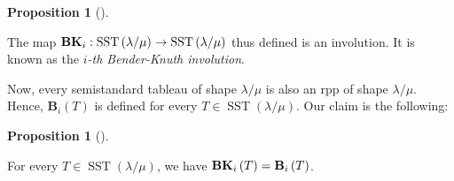 \documentclass[numbers=enddot,12pt,final,onecolumn,notitlepage]{scrartcl}%
\theoremstyle{definition}
\newtheorem{prop}[theo]{Proposition}
\newenvironment{proposition}[1][]
{\begin{prop}[#1]\begin{leftbar}}
{\end{leftbar}\end{prop}}
\def\lm{{\lambda/\mu}}
\begin{document}
%

\begin{proposition}
\label{prop.BKclassical}The map ${\mathbf{BK}}_{i}:\operatorname*{SST}\left(  \lambda
/\mu\right)  \rightarrow\operatorname*{SST}\left(  \lambda/\mu\right)  $ thus
defined is an involution. It is known as the $i$\textit{-th Bender-Knuth
involution}.
\end{proposition}

Now, every semistandard tableau of shape $\lm$ is
also an rpp of shape $\lm$. Hence, $\mathbf{B}_{i}\left(  T\right)  $ is
defined for every $T\in\operatorname*{SST}\left(  \lambda/\mu\right)  $. Our claim is the following:

\begin{proposition}
\label{prop.BK=BK}For every $T\in\operatorname*{SST}\left(  \lambda
/\mu\right)  $, we have ${\mathbf{BK}}_{i}\left(  T\right)  =\mathbf{B}_{i}\left(
T\right)  $.
\end{proposition}
\end{document}

